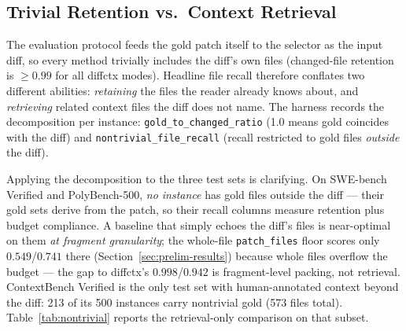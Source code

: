 \documentclass[11pt, a4paper]{article}
\begin{document}
\subsection{Trivial Retention vs.\ Context Retrieval}
\label{sec:nontrivial}

The evaluation protocol feeds the gold patch itself to the selector as the input diff, so every method trivially includes the diff's own files (changed-file retention is $\geq 0.99$ for all diffctx modes). Headline file recall therefore conflates two different abilities: \emph{retaining} the files the reader already knows about, and \emph{retrieving} related context files the diff does not name. The harness records the decomposition per instance: \texttt{gold\_to\_changed\_ratio} (1.0 means gold coincides with the diff) and \texttt{nontrivial\_file\_recall} (recall restricted to gold files \emph{outside} the diff).

Applying the decomposition to the three test sets is clarifying. On SWE-bench Verified and PolyBench-500, \emph{no instance} has gold files outside the diff --- their gold sets derive from the patch, so their recall columns measure retention plus budget compliance. A baseline that simply echoes the diff's files is near-optimal on them \emph{at fragment granularity}; the whole-file \texttt{patch\_files} floor scores only $0.549$/$0.741$ there (Section~\ref{sec:prelim-results}) because whole files overflow the budget --- the gap to diffctx's $0.998$/$0.942$ is fragment-level packing, not retrieval. ContextBench Verified is the only test set with human-annotated context beyond the diff: 213 of its 500 instances carry nontrivial gold (573 files total). Table~\ref{tab:nontrivial} reports the retrieval-only comparison on that subset.
\end{document}
